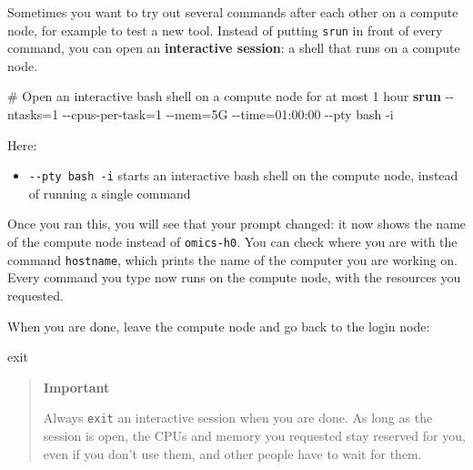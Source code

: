 \documentclass[
  letterpaper,
  DIV=11,
  numbers=noendperiod]{scrreprt}
\newenvironment{Shaded}{}{}
\newcommand{\AttributeTok}[1]{\textcolor[rgb]{0.84,0.23,0.29}{#1}}
\newcommand{\BuiltInTok}[1]{\textcolor[rgb]{0.84,0.23,0.29}{#1}}
\newcommand{\CommentTok}[1]{\textcolor[rgb]{0.42,0.45,0.49}{#1}}
\newcommand{\ExtensionTok}[1]{\textcolor[rgb]{0.84,0.23,0.29}{\textbf{#1}}}
\newcommand{\NormalTok}[1]{\textcolor[rgb]{0.14,0.16,0.18}{#1}}
\newcommand{\OperatorTok}[1]{\textcolor[rgb]{0.14,0.16,0.18}{#1}}
\providecommand{\tightlist}{%
  \setlength{\itemsep}{0pt}\setlength{\parskip}{0pt}}
\begin{document}
\begin{tcolorbox}[enhanced jigsaw, colbacktitle=quarto-callout-tip-color!10!white, rightrule=.15mm, leftrule=.75mm, colback=white, opacitybacktitle=0.6, title=\textcolor{quarto-callout-tip-color}{\faLightbulb}\hspace{0.5em}{Tip: Working interactively on a compute node (optional)}, bottomrule=.15mm, left=2mm, colframe=quarto-callout-tip-color-frame, opacityback=0, breakable, bottomtitle=1mm, coltitle=black, arc=.35mm, toprule=.15mm, toptitle=1mm, titlerule=0mm]

Sometimes you want to try out several commands after each other on a
compute node, for example to test a new tool. Instead of putting
\texttt{srun} in front of every command, you can open an
\textbf{interactive session}: a shell that runs on a compute node.

\begin{Shaded}
\begin{Highlighting}[]
\CommentTok{\# Open an interactive bash shell on a compute node for at most 1 hour}
\ExtensionTok{srun} \AttributeTok{{-}{-}ntasks}\OperatorTok{=}\NormalTok{1 }\AttributeTok{{-}{-}cpus{-}per{-}task}\OperatorTok{=}\NormalTok{1 }\AttributeTok{{-}{-}mem}\OperatorTok{=}\NormalTok{5G }\AttributeTok{{-}{-}time}\OperatorTok{=}\NormalTok{01:00:00 }\AttributeTok{{-}{-}pty}\NormalTok{ bash }\AttributeTok{{-}i}
\end{Highlighting}
\end{Shaded}

Here:

\begin{itemize}
\tightlist
\item
  \texttt{-\/-pty\ bash\ -i} starts an interactive bash shell on the
  compute node, instead of running a single command
\end{itemize}

Once you ran this, you will see that your prompt changed: it now shows
the name of the compute node instead of \texttt{omics-h0}. You can check
where you are with the command \texttt{hostname}, which prints the name
of the computer you are working on. Every command you type now runs on
the compute node, with the resources you requested.

When you are done, leave the compute node and go back to the login node:

\begin{Shaded}
\begin{Highlighting}[]
\BuiltInTok{exit}
\end{Highlighting}
\end{Shaded}

\begin{quote}
\textbf{Important}

Always \texttt{exit} an interactive session when you are done. As long
as the session is open, the CPUs and memory you requested stay reserved
for you, even if you don't use them, and other people have to wait for
them.
\end{quote}

\end{tcolorbox}
\end{document}
